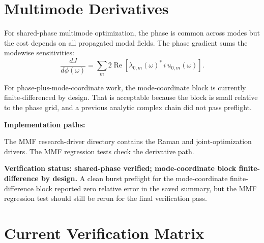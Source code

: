 \documentclass[11pt]{article}
\begin{document}
\section{Multimode Derivatives}

For shared-phase multimode optimization, the phase is common across modes but
the cost depends on all propagated modal fields. The phase gradient sums the
modewise sensitivities:
\[
    \frac{dJ}{d\phi(\omega)}
    =
    \sum_m
    2\operatorname{Re}
    \left[
      \lambda_{0,m}(\omega)^*\,i\,u_{0,m}(\omega)
    \right].
\]

For phase-plus-mode-coordinate work, the mode-coordinate block is currently
finite-differenced by design. That is acceptable because the block is small
relative to the phase grid, and a previous analytic complex chain did not pass
preflight.

\textbf{Implementation paths:}

The MMF research-driver directory contains the Raman and joint-optimization
drivers. The MMF regression tests check the derivative path.

\textbf{Verification status: shared-phase verified; mode-coordinate block
finite-difference by design.} A clean burst preflight for the mode-coordinate
finite-difference block reported zero relative error in the saved summary, but
the MMF regression test should still be rerun for the final verification pass.

\section{Current Verification Matrix}
\end{document}

